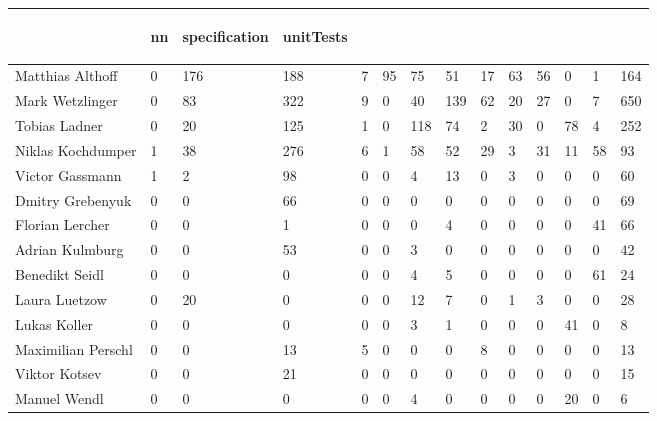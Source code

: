 \begin{table}[htb]
\begin{tabular}{l C{0.5cm} C{0.5cm} C{0.5cm} C{0.5cm} C{0.5cm} C{0.5cm} C{0.5cm} C{0.5cm} C{0.5cm} C{0.5cm} C{0.5cm} C{0.5cm} C{0.5cm} }
\begin{rotate}{90}
        \end{rotate} & \begin{rotate}{90}
                           \textbf{nn}
        \end{rotate} & \begin{rotate}{90}
                           \textbf{specification}
        \end{rotate} & \begin{rotate}{90}
                           \textbf{unitTests}
        \end{rotate} \\
        \midrule
        Matthias Althoff   & 0 & 176 & 188 & 7 & 95 & 75  & 51  & 17 & 63 & 56 & 0  & 1  & 164 \\
        Mark Wetzlinger    & 0 & 83  & 322 & 9 & 0  & 40  & 139 & 62 & 20 & 27 & 0  & 7  & 650 \\
        Tobias Ladner      & 0 & 20  & 125 & 1 & 0  & 118 & 74  & 2  & 30 & 0  & 78 & 4  & 252 \\
        Niklas Kochdumper  & 1 & 38  & 276 & 6 & 1  & 58  & 52  & 29 & 3  & 31 & 11 & 58 & 93  \\
        Victor Gassmann    & 1 & 2   & 98  & 0 & 0  & 4   & 13  & 0  & 3  & 0  & 0  & 0  & 60  \\
        Dmitry Grebenyuk   & 0 & 0   & 66  & 0 & 0  & 0   & 0   & 0  & 0  & 0  & 0  & 0  & 69  \\
        Florian Lercher    & 0 & 0   & 1   & 0 & 0  & 0   & 4   & 0  & 0  & 0  & 0  & 41 & 66  \\
        Adrian Kulmburg    & 0 & 0   & 53  & 0 & 0  & 3   & 0   & 0  & 0  & 0  & 0  & 0  & 42  \\
        Benedikt Seidl     & 0 & 0   & 0   & 0 & 0  & 4   & 5   & 0  & 0  & 0  & 0  & 61 & 24  \\
        Laura Luetzow      & 0 & 20  & 0   & 0 & 0  & 12  & 7   & 0  & 1  & 3  & 0  & 0  & 28  \\
        Lukas Koller       & 0 & 0   & 0   & 0 & 0  & 3   & 1   & 0  & 0  & 0  & 41 & 0  & 8   \\
        Maximilian Perschl & 0 & 0   & 13  & 5 & 0  & 0   & 0   & 8  & 0  & 0  & 0  & 0  & 13  \\
        Viktor Kotsev      & 0 & 0   & 21  & 0 & 0  & 0   & 0   & 0  & 0  & 0  & 0  & 0  & 15  \\
        Manuel Wendl       & 0 & 0   & 0   & 0 & 0  & 4   & 0   & 0  & 0  & 0  & 20 & 0  & 6   \\
        \bottomrule
    \end{tabular}
\end{table}

